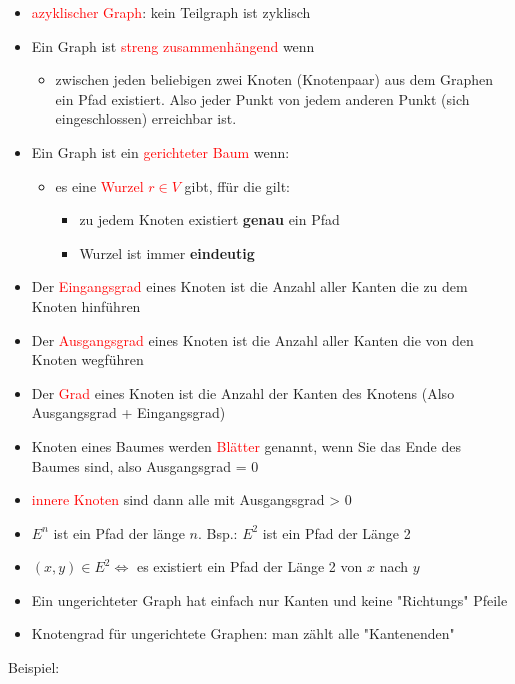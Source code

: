 \documentclass[12pt]{article}
\begin{document}
\begin{flushleft}
\begin{itemize}
        \item \textcolor{red}{azyklischer Graph}: kein Teilgraph ist zyklisch
        \item Ein Graph ist \textcolor{red}{streng zusammenhängend} wenn
        \begin{itemize}
            \item zwischen jeden beliebigen zwei Knoten (Knotenpaar) aus dem Graphen ein Pfad existiert. Also jeder Punkt von jedem anderen Punkt (sich eingeschlossen) erreichbar ist. 
        \end{itemize}
        \item Ein Graph ist ein \textcolor{red}{gerichteter Baum} wenn:
        \begin{itemize}
            \item es eine \textcolor{red}{Wurzel $r \in V$} gibt, ffür die gilt:
            \begin{itemize}
                \item zu jedem Knoten existiert \textbf{genau} ein Pfad
                \item Wurzel ist immer \textbf{eindeutig}
            \end{itemize}
        \end{itemize}
        \item Der \textcolor{red}{Eingangsgrad} eines Knoten ist die Anzahl aller Kanten die zu dem Knoten hinführen
        \item Der \textcolor{red}{Ausgangsgrad} eines Knoten ist die Anzahl aller Kanten die von den Knoten wegführen
        \item Der \textcolor{red}{Grad} eines Knoten ist die Anzahl der Kanten des Knotens (Also Ausgangsgrad + Eingangsgrad)
        \item Knoten eines Baumes werden \textcolor{red}{Blätter} genannt, wenn Sie das Ende des Baumes sind, also Ausgangsgrad = 0
        \item \textcolor{red}{innere Knoten} sind dann alle mit Ausgangsgrad > 0
        \item $E^n$ ist ein Pfad der länge $n$. Bsp.: $E^2$ ist ein Pfad der Länge 2
        \item $(x,y) \in E^2 \Leftrightarrow$ es existiert ein Pfad der Länge 2 von $x$ nach $y$
        \item Ein ungerichteter Graph hat einfach nur Kanten und keine "Richtungs" Pfeile
        \item Knotengrad für ungerichtete Graphen: man zählt alle "Kantenenden"
    \end{itemize}
    \vspace{1cm}
    Beispiel: \linebreak
    \linebreak
\end{flushleft}
\end{document}

